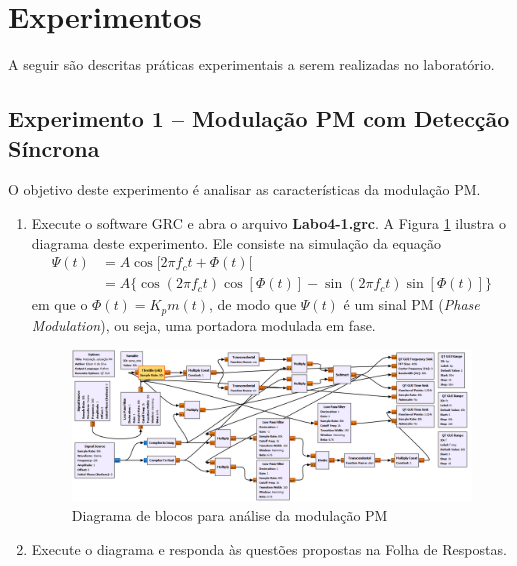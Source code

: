 \documentclass[12pt,addpoints]{exam}
\begin{document}
\clearpage

\section{Experimentos}

A seguir são descritas práticas experimentais a serem realizadas no laboratório. 

\subsection{Experimento 1 -- Modulação PM com Detecção Síncrona}

O objetivo deste experimento é analisar as características da modulação PM.

\begin{enumerate}   
    \item Execute o software GRC e abra o arquivo \textbf{Labo4-1.grc}. A Figura \ref{fig:GRC_4-1} ilustra o diagrama deste experimento. Ele consiste na simulação da equação 
\begin{align}
  \varPsi(t) &= A\cos[2\pi f_c t + \Phi(t)[\nonumber\\
   &= A\{\cos(2\pi f_c t) \cos[\Phi(t)] -  \sin(2\pi f_c t) \sin[\Phi(t)]\}
  \label{eq:pm}
\end{align}
em que o $\Phi(t) = K_pm(t)$, de modo que $\varPsi(t)$ é um sinal PM ({\it Phase Modulation}), ou seja, uma portadora modulada em fase.
    \begin{figure}[htb]
        \centering
        \includegraphics[width=0.95\linewidth]{./Figuras/Labo4-1.png}
        \caption{Diagrama de blocos para análise da modulação PM} 
        \label{fig:GRC_4-1}
    \end{figure}
  \item Execute o diagrama e responda às questões propostas na Folha de Respostas.
  \end{enumerate}
  
\end{document}
